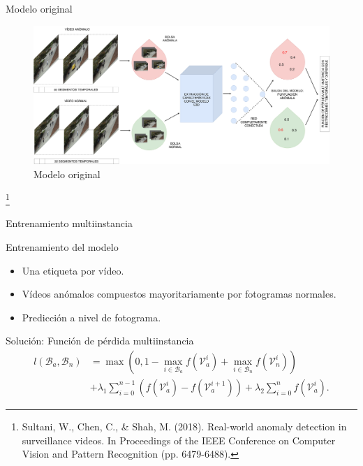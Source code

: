 \documentclass[10pt]{beamer}
\newcommand\blfootnote[1]{%
  \begingroup
  \renewcommand\thefootnote{}\footnote{#1}%
  \addtocounter{footnote}{-1}%
  \endgroup
}
\begin{document}
\begin{frame}{Modelo original}
  \begin{figure}
    \centering
    \includegraphics[width=.9\textwidth]{images/original-model.pdf}
    \caption{Modelo original}
  \end{figure}

  \blfootnote{Sultani, W., Chen, C., \& Shah, M. (2018). Real-world
    anomaly detection in surveillance videos. In Proceedings of the
    IEEE Conference on Computer Vision and Pattern Recognition
    (pp. 6479-6488).}
\end{frame}

\begin{frame}{Entrenamiento multiinstancia}
  \begin{block}{Entrenamiento del modelo}
    \begin{itemize}
    \item Una etiqueta por vídeo.
    \item Vídeos anómalos compuestos mayoritariamente por fotogramas normales.
    \item Predicción a nivel de fotograma.
    \end{itemize}
  \end{block}

  Solución: Función de pérdida multiinstancia
  \begin{align*}
    l(\mathcal{B}_a, \mathcal{B}_n)
    &= \max{(0, 1 - \max_{i \in \mathcal{B}_a}{f(\mathcal{V}^i_a)} +
      \max_{i \in \mathcal{B}_n}{f(\mathcal{V}^i_n)})}\\
    & + \lambda_1
      \sum_{i=0}^{n-1} (f(\mathcal{V}_a^i) - f(\mathcal{V}_a^{i+1})) +
      \lambda_2 \sum_{i=0}^{n} f(\mathcal{V}_a^i).
  \end{align*}

\end{frame}
\end{document}
